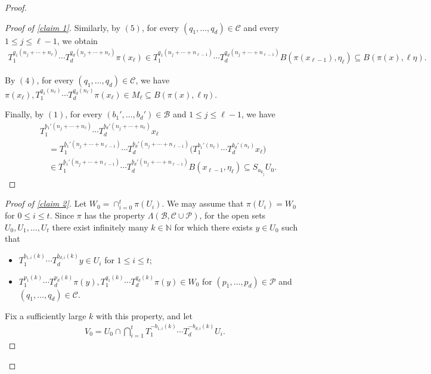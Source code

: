 \documentclass[11pt,reqno]{amsart}
\newcommand{\N}{\mathbb{N}}
\newcommand{\cB}{{\mathcal B}}
\newcommand{\cC}{{\mathcal C}}
\newcommand{\cP}{{\mathcal P}}
\theoremstyle{definition}
\theoremstyle{remark}
\begin{document}
\begin{proof}
\begin{proof}[Proof of \cref{claim 1}]
Similarly, by $(5)$, for every $(q_1,\dots,q_d)\in\cC$ and every $1\leq j\leq \ell-1$, we obtain\begin{align*}
    T_1^{q_1(n_j+\cdots+n_\ell)}\cdots  T_d^{q_d(n_j+\cdots+n_\ell)}\pi(x_\ell) \in T_1^{q_1(n_j+\cdots+n_{\ell-1})} \cdots T_d^{q_d(n_j+\cdots+n_{\ell-1})}B(\pi(x_{\ell-1}),\eta_\ell) \subseteq B(\pi(x),\ell\eta).
\end{align*}

By $(4)$, for every $(q_1,\dots,q_d)\in \cC$, we have $\pi(x_\ell),T_1^{q_1(n_\ell)}\cdots T_d^{q_d(n_\ell)}\pi(x_\ell)\in M_\ell \subseteq B(\pi(x),\ell\eta)$.

Finally, by $(1)$, for every $(b_1',\dots,b_d')\in \cB$ and
$1\leq j \leq \ell-1$, we have\begin{align*}
&T_1^{b_{1}'(n_j+\cdots+n_\ell)}\cdots
 T_d^{b_{d}'(n_j+\cdots+n_\ell)}x_\ell       \\
&\quad =
T_1^{b_{1}'(n_j+\cdots+n_{\ell-1})}\cdots
T_d^{b_{d}'(n_j+\cdots+n_{\ell-1})} 
\big(T_1^{b_1'(n_\ell)}\cdots T_d^{b_d'(n_\ell)}x_\ell\big)                                        \\
&\quad \in
T_1^{b_1'(n_j+\cdots+n_{\ell-1})}\cdots
T_d^{b_d'(n_j+\cdots+n_{\ell-1})}
B(x_{\ell-1},\eta_\ell)   \subseteq S_{a_{k_j}}U_0 .
\end{align*}

    
\end{proof}

\begin{proof}[Proof of \cref{claim 2}]
    Let $W_0 = \cap_{i=0}^{t}\pi(U_i)$. We may assume that $\pi(U_i)=W_0$ for $0\leq i \leq t$. Since $\pi$ has the property $\Lambda(\cB,\cC \cup \cP)$, for the open sets $U_0,U_1,\dots,U_t$ there exist infinitely many $k\in \N$ for which there exists $y\in U_0$ such that\begin{itemize}
        \item $T_1^{b_{1,i}(k)}\cdots T_d^{b_{d,i}(k)}y\in U_i$ for $1\leq i \leq t$;
        \item $T_1^{p_1(k)}\cdots T_d^{p_d(k)}\pi(y),T_1^{q_1(k)}\cdots T_d^{q_d(k)}\pi(y)\in W_0$ for $(p_1,\dots,p_d)\in \cP$ and $(q_1,\dots,q_d)\in \cC$.
    \end{itemize}

    Fix a sufficiently large $k$ with this property, and let\begin{align*}
        V_0 = U_0 \cap \bigcap_{i=1}^{t}T_1^{-b_{1,i}(k)}\cdots T_d^{-b_{d,i}(k)}U_i.
    \end{align*}
    

\end{proof}
\end{proof}
\end{document}
